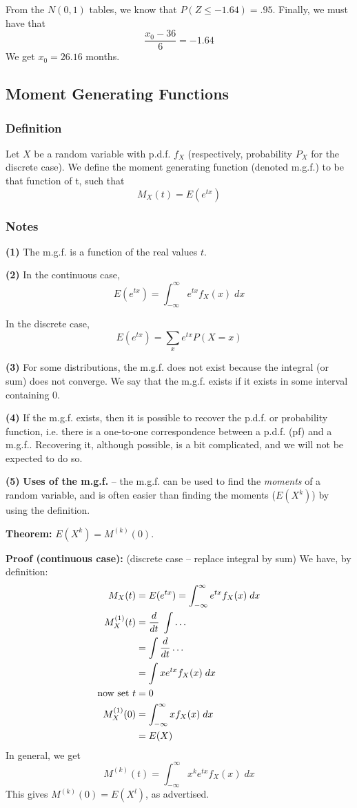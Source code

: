\documentclass[12pt]{article}
\begin{document}
From the $N(0,1)$ tables, we know that $P(Z \leq -1.64) = .95$. Finally, we must have that
\[
    \frac{x_0 - 36}{6} = -1.64
\]
We get $x_0 = 26.16$ months.

\subsection{Moment Generating Functions}
\subsubsection{Definition}
Let $X$ be a random variable with p.d.f. $f_X$ (respectively, probability $P_X$ for the discrete case). We define the moment generating function (denoted m.g.f.) to be that function of t, such that
\[
    M_X (t) = E ( e^{tx} )
\]

\subsubsection{Notes}
\textbf{(1)} The m.g.f. is a function of the real values $t$.

\textbf{(2)} In the continuous case, 
\[
    E(e^{tx}) = \int_{-\infty}^{\infty} e^{tx} f_X (x) \; dx
\]

In the discrete case,
\[
    E(e^{tx}) = \sum_x e^{tx} P(X = x)
\]

\textbf{(3)} For some distributions, the m.g.f. does not exist because the integral (or sum) does not converge. We say that the m.g.f. exists if it exists in some interval containing 0. 

\textbf{(4)} If the m.g.f. exists, then it is possible to recover the p.d.f. or probability function, i.e. there is a one-to-one correspondence between a p.d.f. (pf) and a m.g.f.. Recovering it, although possible, is a bit complicated, and we will not be expected to do so.

\textbf{(5)} \textbf{Uses of the m.g.f.} -- the m.g.f. can be used to find the \emph{moments} of a random variable, and is often easier than finding the moments ($E(X^k)$) by using the definition. 

\textbf{Theorem:} $E(X^k) = M^{(k)} (0)$.

\textbf{Proof (continuous case):} (discrete case -- replace integral by sum) We have, by definition:
\begin{align*}
   M_X (t) &= E(e^{tx}) = \int_{-\infty}^{\infty} e^{tx} f_X (x) \; dx \\
   M_X^{(1)} (t) &= \frac{d}{dt} \; \int \ldots \\
    &= \int \frac{d}{dt} \ldots \\
    &= \int x e^{tx} f_X (x) \; dx \\
   \textnormal{now set } t &= 0 \\
   M_X^{(1)} (0) &= \int_{-\infty}^{\infty} x f_X (x) \; dx \\
    &= E(X)
\end{align*}
In general, we get 
\[
    M^{(k)} (t) = \int_{-\infty}^{\infty} x^k e^{tx} f_X (x) \; dx
\]
This gives $M^{(k)} (0) = E(X^l)$, as advertised.
\end{document}
